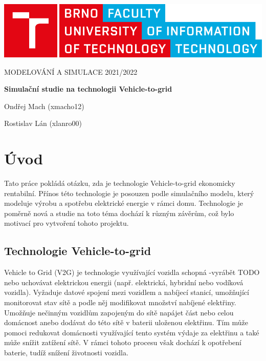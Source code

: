 \documentclass[12pt,a4paper]{article}
\begin{document}
\begin{titlepage}
\begin{center}
\includegraphics[width=0.5\linewidth]{img/logo.pdf}
\vspace{3cm}

\LARGE\uppercase{Modelování a simulace 2021/2022}
\vspace{1cm}

\LARGE\textbf{Simulační studie na technologii Vehicle-to-grid}

\vspace*{\fill}
\large{Ondřej Mach (xmacho12)}

\large{Rostislav Lán (xlanro00)}

\end{center}
\end{titlepage}


\setcounter{page}{1}
\tableofcontents
\clearpage


\section{Úvod}
Tato práce pokládá otázku, zda je technologie Vehicle-to-grid ekonomicky rentabilní.
Přínos této technologie je posouzen podle simulačního modelu, který modeluje výrobu a spotřebu elektrické energie v rámci domu.
Technologie je poměrně nová a studie na toto téma dochází k různým závěrům, což bylo motivací pro vytvoření tohoto projektu.

\subsection{Technologie Vehicle-to-grid}
Vehicle to Grid (V2G) je technologie využívající vozidla schopná -vyrábět TODO nebo uchovávat elektrickou energii (např. elektrická, hybridní nebo vodíková vozidla).
Vyžaduje datové spojení mezi vozidlem a nabíjecí stanicí, umožňující monitorovat stav sítě a podle něj modifikovat množství nabíjené elektřiny.
Umožňuje nečinným vozidlům zapojeným do sítě napájet část nebo celou domácnost anebo dodávat do této sítě v baterii uloženou elektřinu.
Tím může pomoci redukovat domácnosti využívající tento systém výdaje za elektřinu a také může snížit zatížení sítě.
V rámci tohoto procesu však dochází k opotřebení baterie, tudíž snížení životnosti vozidla.
\end{document}
